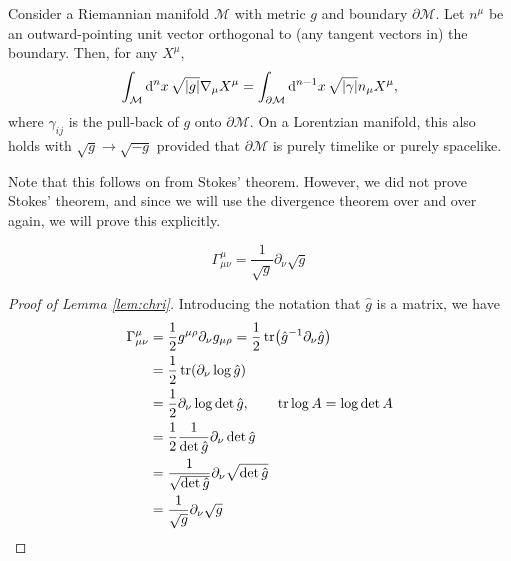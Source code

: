 \begin{theorem}
  \label{thm:divergence}
  Consider a Riemannian manifold $\mathcal{M}$ with metric $g$ and boundary $\partial \mathcal{M}$.
  Let $n^\mu$ be an outward-pointing unit vector orthogonal to (any tangent vectors in) the boundary.
  Then, for any $X^\mu$, 
  \begin{equation}
    \int_{\mathcal{M}} \dd[n]{x} \sqrt{\abs{g}} \nabla_{\mu} X^\mu = \int_{\partial \mathcal{M}} \dd[n-1]{x} \sqrt{\abs{\gamma}} n_\mu X^\mu,
  \end{equation}
  where $\gamma_{ij}$ is the pull-back of $g$ onto $\partial \mathcal{M}$.
  On a Lorentzian manifold, this also holds with $\sqrt{g} \to \sqrt{-g}$ provided that $\partial \mathcal{M}$ is purely timelike or purely spacelike.
\end{theorem}
\begin{leftbar}
  \begin{remark}
    Note that this follows on from Stokes' theorem. However, we did not prove Stokes' theorem, and since we will use the divergence theorem over and over again, we will prove this explicitly.
  \end{remark}
\end{leftbar}
\begin{lemma}
  \label{lem:chri}
  \begin{equation}
    \Gamma^\mu_{\mu\nu} = \frac{1}{\sqrt{g}} \partial_\nu \sqrt{g}
  \end{equation}
\end{lemma}
\begin{proof}[Proof of Lemma \ref{lem:chri}]
  Introducing the notation that $\hat g$ is a matrix, we have
  \begin{align}
    \Gamma^\mu_{\mu\nu} &= \frac{1}{2} g^{\mu\rho} \partial_\nu g_{\mu\rho} = \frac{1}{2} \tr(\hat g^{-1} \partial_\nu \hat g) \\
			&= \frac{1}{2} \tr (\partial_\nu \log \hat g) \\
			&= \frac{1}{2} \partial_\nu \log \det \hat g, \qquad \tr \log A = \log \det A \\
			&= \frac{1}{2} \frac{1}{\det \hat g} \partial_\nu \det \hat g \\
			&= \frac{1}{\sqrt{\det \hat g}} \partial_\nu \sqrt{\det \hat g} \\
			&= \frac{1}{\sqrt{g}} \partial_\nu \sqrt{g}
  \end{align}
\end{proof}

